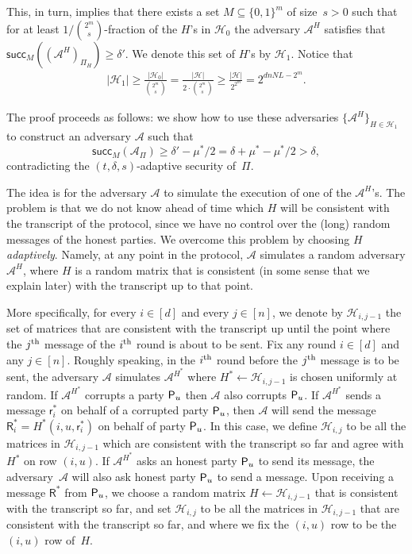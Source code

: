 \documentclass[11pt]{article}
\theoremstyle{plain}
\theoremstyle{definition}
\numberwithin{equation}{section}
\numberwithin{equation}{section} \newcommand{\aka} {also known as\ }
\newcommand{\abs}[1]{\left|#1\right|}
\newcommand{\Hc}{\mathcal H}
\newcommand{\1}{\mathbf{1}}
\newcommand{\Adv}{\mathcal A}
\newcommand{\ith}[1]{{#1}\textsuperscript{th}}
\newcommand{\lo}{{\mathsf{R}}}
\newcommand{\sh}{{\mathsf{r}}}
\newcommand{\success}{{\mathsf{succ}}}
\newcommand{\valb}[3]{{\success_{#1}(#3_{#2})}}
\theoremstyle{remark}
\begin{document}
This, in turn, implies that there exists a set $M\subseteq\{0,1\}^m$ of size~$s>0$
such that for at least $1/{{2^m}\choose{s}}$-fraction of the
$H$'s in $\Hc_0$ the adversary $\Adv^H$ satisfies that $\valb{M}{\Pi_H}{\left(\Adv^H\right)}\geq\delta'$.  We denote this
set of $H$'s by $\Hc_1$. Notice that
\begin{align}\label{eqn:H1}
  \abs{\Hc_1} \geq \frac{\abs{\Hc_0}}{{2^m \choose s}} = \frac{\abs{\Hc}}{2\cdot{2^m
      \choose s}} \geq \frac{\abs{\Hc}}{2^{2^m}} = 2^{dnNL-2^m}.
\end{align}

The proof proceeds as follows: we show how to use these adversaries
$\{\Adv^H\}_{H\in \Hc_1}$ to construct an adversary $\Adv$ such that
$$\valb{M}{\Pi}{\Adv}\geq\delta'-\mu^*/2=\delta+\mu^*-\mu^*/2>\delta,$$
contradicting the $(t,\delta,s)$-adaptive security of~$\Pi$.

The idea is for the adversary $\Adv$ to simulate the execution of one of the
$\Adv^H$'s. The problem is that we do not know ahead of time which $H$ will be
consistent with the transcript of the protocol, since we have no control over the (long) random messages of the honest parties.
We overcome this problem by choosing $H$ {\em adaptively}.  Namely, at any point in the protocol, $\Adv$
simulates a random adversary $\Adv^H$, where $H$ is a random matrix that
is consistent (in some sense that we explain later) with the transcript up to that point.


More specifically, for every $i\in[d]$ and every $j\in[n]$, we denote by
$\Hc_{i,j-1}$ the set of matrices that are consistent with the transcript up
until the point where the $\ith{j}$ message of the $\ith{i}$ round is about to
be sent.  Fix any round $i\in[d]$ and any $j\in[n]$. Roughly speaking, in the $\ith{i}$ round before the $\ith{j}$ message is to be sent, the adversary $\Adv$
simulates $\Adv^{H^*}$ where $H^*\leftarrow\Hc_{i,j-1}$ is chosen
uniformly at random. If $\Adv^{H^*}$ corrupts a party $\mathsf{P}_{{u}}$ then $\Adv$
also corrupts $\mathsf{P}_{{u}}$.  If $\Adv^{H^*}$ sends a message $\sh_i^*$ on behalf
of a corrupted party $\mathsf{P}_{{u}}$, then $\Adv$ will send the message
$\lo^*_i=H^*(i,u, \sh_i^*)$ on behalf of party $\mathsf{P}_{{u}}$.  In this case, we
define $\Hc_{i,j}$ to be all the matrices in $\Hc_{i,j-1}$ which are consistent
with the transcript so far and agree with $H^*$ on row
$(i,u)$.  If $\Adv^{H^*}$ asks an honest party $\mathsf{P}_{{u}}$ to send its message,
the adversary~$\Adv$ will also ask honest party $\mathsf{P}_{{u}}$ to send a message. Upon
receiving a message $\lo^*$ from $\mathsf{P}_{{u}}$, we choose a random matrix $H\leftarrow\Hc_{i,j-1}$ that is consistent with the transcript so far, and set $\Hc_{i,j}$ to be all the
matrices in $\Hc_{i,j-1}$ that are consistent with the transcript so far, and
where we fix the $(i,u)$ row to be the $(i,u)$ row of~$H$.
\end{document}
